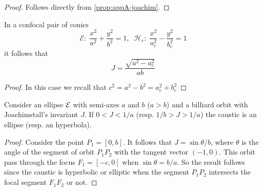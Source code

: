 	\begin{proof} Follows directly from \cref{prop:appA-joachim}.
	    
	\end{proof}
	
	\begin{proposition}
	    In a confocal pair of conics
	    \[\mathcal{E}:\; \frac{x^2}{a^2}+\frac{y^2}{b^2}=1,\;\; \mathcal{H}_c:\; \frac{x^2}{a_c^2}-\frac{y^2}{b_c^2}=1\]
	    it follows that
	     \[ J  =\frac{\sqrt{  a^2 - a_c^2}}{a b} \]
	    \label{prop:appA-confocal-EH}
	\end{proposition}
	
	\begin{proof}
	    In this case we  recall that $c^2=a^2-b^2=a_c^2+b_c^2$
	\end{proof}
	
	\begin{proposition}
	    Consider an ellipse $\mathcal{E}$ with semi-axes $a$ and $b$ \textrm{(}$a>b$\textrm{)} and a billiard orbit with Joachimstall's invariant $J$.
	    If $0<J<1/a$ \textrm{(}resp. $1/b> J> 1/a$\textrm{)} the caustic is an ellipse (resp. an hyperbola).
	\end{proposition}
	
	\begin{proof} Consider the point $P_1=[0,b].$ It follows that
	$J=\sin\theta/b$, where $\theta$ is the angle of the segment of orbit  $P_1P_2$  with the tangent vector $(-1,0)$. This orbit pass through the focus $F_1=[-c,0]$ when $\sin\theta=b/a$. So the result follows since the caustic is   hyperbolic or elliptic when the segment $P_1P_2$ intersects the focal segment $F_1F_2$ or not.  
	    
	\end{proof}